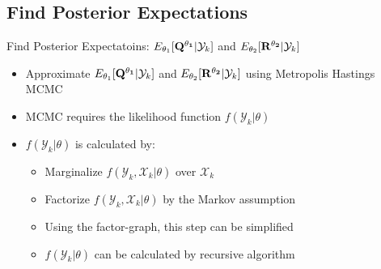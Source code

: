 \subsection{Find Posterior Expectations}
\begin{frame}{Find Posterior Expectatoins: $E_{\theta_1}[{\bf Q^{\theta_1}}|\mathcal{Y}_k]$ and $E_{\theta_2}[{\bf R^{\theta_2}}|\mathcal{Y}_k]$}
\begin{itemize}
    \item Approximate $E_{\theta_1}[{\bf Q^{\theta_1}}|\mathcal{Y}_k]$ and $E_{\theta_2}[{\bf R^{\theta_2}}|\mathcal{Y}_k]$ using Metropolis Hastings MCMC
    \item MCMC requires the likelihood function $f(\mathcal{Y}_k|\theta)$
    \item $f(\mathcal{Y}_k|\theta)$ is calculated by:
    \begin{itemize}
        \item Marginalize $f(\mathcal{Y}_k, \mathcal{X}_k|\theta)$ over $\mathcal{X}_k$
        \item Factorize $f(\mathcal{Y}_k, \mathcal{X}_k|\theta)$ by the Markov assumption
        \item Using the factor-graph, this step can be simplified 
        \item $f(\mathcal{Y}_k|\theta)$ can be calculated by recursive algorithm
    \end{itemize}
\end{itemize}
\end{frame}

